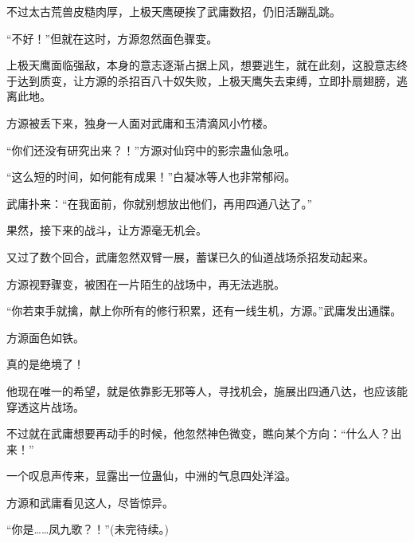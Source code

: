 \begin{this_body}
不过太古荒兽皮糙肉厚，上极天鹰硬挨了武庸数招，仍旧活蹦乱跳。

“不好！”但就在这时，方源忽然面色骤变。

上极天鹰面临强敌，本身的意志逐渐占据上风，想要逃生，就在此刻，这股意志终于达到质变，让方源的杀招百八十奴失败，上极天鹰失去束缚，立即扑扇翅膀，逃离此地。

方源被丢下来，独身一人面对武庸和玉清滴风小竹楼。

“你们还没有研究出来？！”方源对仙窍中的影宗蛊仙急吼。

“这么短的时间，如何能有成果！”白凝冰等人也非常郁闷。

武庸扑来：“在我面前，你就别想放出他们，再用四通八达了。”

果然，接下来的战斗，让方源毫无机会。

又过了数个回合，武庸忽然双臂一展，蓄谋已久的仙道战场杀招发动起来。

方源视野骤变，被困在一片陌生的战场中，再无法逃脱。

“你若束手就擒，献上你所有的修行积累，还有一线生机，方源。”武庸发出通牒。

方源面色如铁。

真的是绝境了！

他现在唯一的希望，就是依靠影无邪等人，寻找机会，施展出四通八达，也应该能穿透这片战场。

不过就在武庸想要再动手的时候，他忽然神色微变，瞧向某个方向：“什么人？出来！”

一个叹息声传来，显露出一位蛊仙，中洲的气息四处洋溢。

方源和武庸看见这人，尽皆惊异。

“你是……凤九歌？！”(未完待续。)

\end{this_body}


